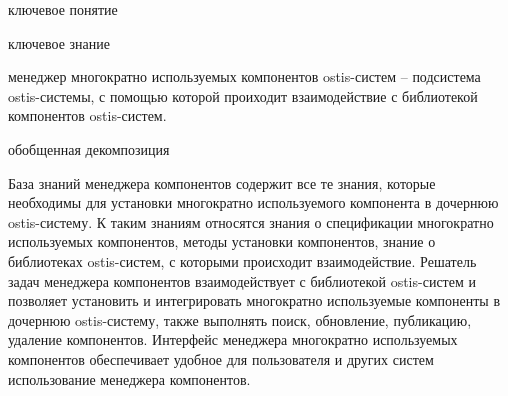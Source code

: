 \begin{SCn}
\begin{scnrelfromlist}{ключевое понятие}
\end{scnrelfromlist}
\end{SCn}

\bigskip

\begin{SCn}
\begin{scnrelfromlist}{ключевое знание}
\end{scnrelfromlist}
\end{SCn}

\bigskip

менеджер многократно используемых компонентов ostis-систем -- подсистема ostis-системы, с помощью которой проиходит взаимодействие с библиотекой компонентов ostis-систем.

\begin{SCn}
\begin{scnrelfromset}{обобщенная декомпозиция}
\end{scnrelfromset}
\end{SCn}

База знаний менеджера компонентов содержит все те знания, которые необходимы для установки многократно используемого компонента в дочернюю ostis-систему. К таким знаниям относятся знания о спецификации многократно используемых компонентов, методы установки компонентов, знание о  библиотеках ostis-систем, с которыми происходит взаимодействие. Решатель задач менеджера компонентов взаимодействует с библиотекой ostis-систем и позволяет установить и интегрировать многократно используемые компоненты в дочернюю ostis-систему, также выполнять поиск, обновление, публикацию, удаление компонентов. Интерфейс менеджера многократно используемых компонентов обеспечивает удобное для пользователя и других систем использование менеджера компонентов.

